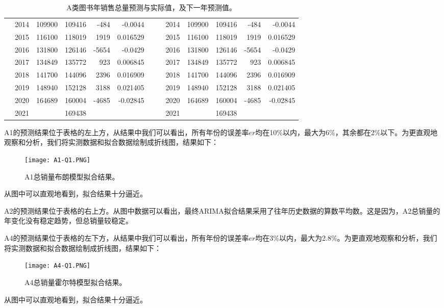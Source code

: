 \documentclass[bwprint]{gmcmthesis}
\begin{document}
\begin{table}[htbp]
{\begin{tabular}{rrrrrrrrrrrrr}
          & 2014  & 109900 & 109416 & -484  & -0.0044 &       &       & 2014  & 109900 & 109416 & -484  & -0.0044 \\
          & 2015  & 116100 & 118019 & 1919  & 0.016529 &       &       & 2015  & 116100 & 118019 & 1919  & 0.016529 \\
          & 2016  & 131800 & 126146 & -5654 & -0.0429 &       &       & 2016  & 131800 & 126146 & -5654 & -0.0429 \\
          & 2017  & 134849 & 135772 & 923   & 0.006845 &       &       & 2017  & 134849 & 135772 & 923   & 0.006845 \\
          & 2018  & 141700 & 144096 & 2396  & 0.016909 &       &       & 2018  & 141700 & 144096 & 2396  & 0.016909 \\
          & 2019  & 148940 & 152128 & 3188  & 0.021405 &       &       & 2019  & 148940 & 152128 & 3188  & 0.021405 \\
          & 2020  & 164689 & 160004 & -4685 & -0.02845 &       &       & 2020  & 164689 & 160004 & -4685 & -0.02845 \\
          &    2021   &       & 169438 &       &       &       &       & 2021  &       & 169438 &       &  \\
          \bottomrule
    \end{tabular}%
    }
\caption{A类图书年销售总量预测与实际值，及下一年预测值。}
\label{tab:q1-total}
\end{table}

A1的预测结果位于表格的左上方，从结果中我们可以看出，所有年份的误差率$er$均在10\%以内，最大为6\%，其余都在2\%以下。为更直观地观察和分析，我们将实测数据和拟合数据绘制成折线图，结果如下：
\begin{figure}[H]
	\centering		
	\texttt{[image: A1-Q1.PNG]}
	\caption{A1总销量布朗模型拟合结果。}
	\label{fig:a1-q1}
\end{figure}
从图中可以直观地看到，拟合结果十分逼近。

A2的预测结果位于表格的右上方。从图中数据可以看出，最终ARIMA拟合结果采用了往年历史数据的算数平均数。这是因为，A2总销量的年变化没有稳定趋势，但总销量较稳定。

A4的预测结果位于表格的左下方，从结果中我们可以看出，所有年份的误差率$er$均在3\%以内，最大为2.8\%。为更直观地观察和分析，我们将实测数据和拟合数据绘制成折线图，结果如下：
\begin{figure}[H]
	\centering		
	\texttt{[image: A4-Q1.PNG]}
	\caption{A4总销量霍尔特模型拟合结果。}
	\label{fig:a4-q1}
\end{figure}
从图中可以直观地看到，拟合结果十分逼近。
\end{document}
